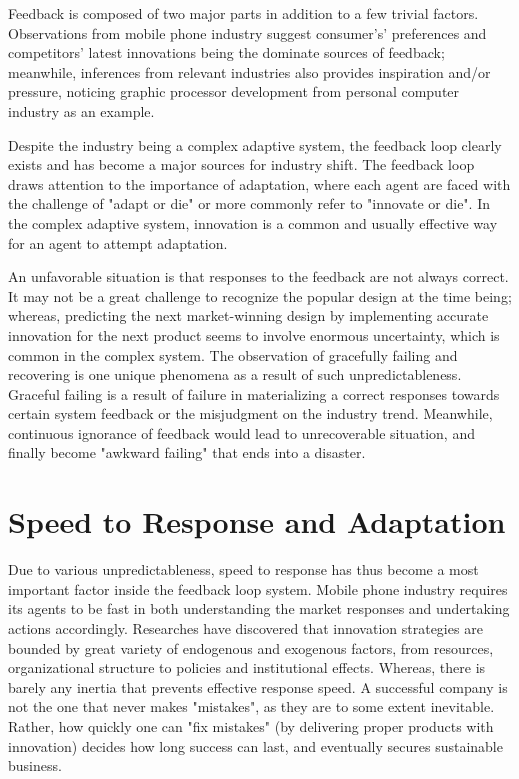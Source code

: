 \documentclass[utf8,english]{gradu3}
\begin{document}
Feedback is composed of two major parts in addition to a few trivial factors. Observations from mobile phone industry suggest consumer's' preferences and competitors' latest innovations being the dominate sources of feedback; meanwhile, inferences from relevant industries also provides inspiration and/or pressure, noticing graphic processor development from personal computer industry as an example.

Despite the industry being a complex adaptive system, the feedback loop clearly exists and has become a major sources for industry shift. The feedback loop draws attention to the importance of adaptation, where each agent are faced with the challenge of "adapt or die" or more commonly refer to "innovate or die". In the complex adaptive system, innovation is a common and usually effective way for an agent to attempt adaptation. 

An unfavorable situation is that responses to the feedback are not always correct. It may not be a great challenge to recognize the popular design at the time being; whereas, predicting the next market-winning design by implementing accurate innovation for the next product seems to involve enormous uncertainty, which is common in the complex system. The observation of gracefully failing and recovering is one unique phenomena as a result of such unpredictableness. Graceful failing is a result of failure in materializing a correct responses towards certain system feedback or the misjudgment on the industry trend. Meanwhile,  continuous ignorance of feedback would lead to unrecoverable situation, and finally become "awkward failing" that ends into a disaster.  

\section{Speed to Response and Adaptation}

Due to various unpredictableness, speed to response has thus become a most important factor inside the feedback loop system. Mobile phone industry requires its agents to be fast in both understanding the market responses and undertaking actions accordingly. Researches have discovered that innovation strategies are bounded by great variety of endogenous and exogenous factors, from resources, organizational structure to policies and institutional effects. Whereas, there is barely any inertia that prevents effective response speed. A successful company is not the one that never makes "mistakes", as they are to some extent inevitable. Rather, how quickly one can "fix mistakes" (by delivering proper products with innovation) decides how long success can last, and eventually secures sustainable business.
\end{document}
